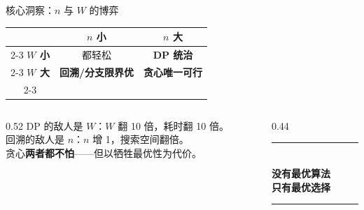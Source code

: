 \documentclass[9pt]{ctexbeamer}
\newcommand{\hi}[1]{\textcolor{ember}{\textbf{#1}}}
\newcommand{\blu}[1]{\textcolor{accent}{\textbf{#1}}}
\begin{document}
\begin{frame}{核心洞察：$n$ 与 $W$ 的博弈}

\vspace{-0.15cm}
\begin{center}
\renewcommand{\arraystretch}{2.0}
\large
\begin{tabular}{c|c|c|}
\multicolumn{1}{c}{} & \multicolumn{1}{c}{\textbf{$n$ 小}} & \multicolumn{1}{c}{\textbf{$n$ 大}} \\
\cline{2-3}
\textbf{$W$ 小} & \color{slate}都轻松 & \blu{DP 统治} \\
\cline{2-3}
\textbf{$W$ 大} & \hi{回溯/分支限界优} & \hi{贪心唯一可行} \\
\cline{2-3}
\end{tabular}
\end{center}

\vspace{0.25cm}

\begin{columns}[T]
\begin{column}{0.52\textwidth}
{\footnotesize\color{slate}
DP 的敌人是 \hi{$W$}：$W$ 翻 10 倍，耗时翻 10 倍。\\
回溯的敌人是 \hi{$n$}：$n$ 增 1，搜索空间翻倍。\\
贪心\blu{两者都不怕}——但以牺牲最优性为代价。
}
\end{column}
\begin{column}{0.44\textwidth}
\begin{center}
\textcolor{ember}{\rule{2cm}{0.5pt}}\\[0.2cm]
{\large\color{ink}\textbf{没有最优算法\\只有最优选择}}\\[0.2cm]
\textcolor{ember}{\rule{2cm}{0.5pt}}
\end{center}
\end{column}
\end{columns}

\end{frame}
\end{document}
